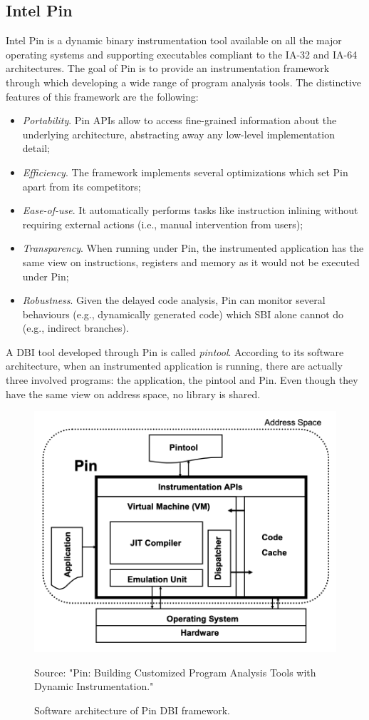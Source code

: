 \documentclass[LaM,binding=0.6cm]{sapthesis}
\newcommand{\source}[1]{\caption*{Source: {#1}} }
\begin{document}
\subsection{Intel Pin}
Intel Pin is a dynamic binary instrumentation tool available on all the major operating systems and supporting executables compliant to the IA-32 and IA-64 architectures. The goal of Pin is to provide an instrumentation framework through which developing a wide range of program analysis tools. The distinctive features of this framework are the following:
\begin{itemize}
\item \textit{Portability}. Pin APIs allow to access fine-grained information about the underlying architecture, abstracting away any low-level implementation detail;
\item \textit{Efficiency}. The framework implements several optimizations which set Pin apart from its competitors;
\item \textit{Ease-of-use}. It automatically performs tasks like instruction inlining without requiring external actions (i.e., manual intervention from users);
\item \textit{Transparency}. When running under Pin, the instrumented application has the same view on instructions, registers and memory as it would not be executed under Pin;
\item \textit{Robustness}. Given the delayed code analysis, Pin can monitor several behaviours (e.g., dynamically generated code) which SBI alone cannot do (e.g., indirect branches).
\end{itemize}
A DBI tool developed through Pin is called \textit{pintool}. According to its software architecture, when an instrumented application is running, there are actually three involved programs: the application, the pintool and Pin. Even though they have the same view on address space, no library is shared.

\begin{figure}[h!]
\centering
\includegraphics[scale=.7]{images/techn7}
\caption{Software architecture of Pin DBI framework.}
\source{"Pin: Building Customized Program Analysis Tools with Dynamic Instrumentation."}
\end{figure}
\newpage
\end{document}

